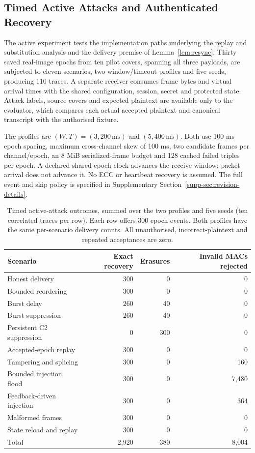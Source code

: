 \documentclass[pdflatex,sn-mathphys-num]{sn-jnl}%
\renewcommand{\arraystretch}{1.2}
\renewcommand{\arraystretch}{1.0}
\theoremstyle{definition}
\theoremstyle{game}
\theoremstyle{thmstyleone}%
\theoremstyle{thmstyletwo}%
\theoremstyle{thmstylethree}%
\begin{document}
\subsection{Timed Active Attacks and Authenticated Recovery}
\label{subsec:multichannel_robustness}
\label{subsec:revised-active}

The active experiment tests the implementation paths underlying the
replay and substitution analysis and the delivery premise of
Lemma~\ref{lem:resync}. Thirty saved real-image epochs from ten pilot
covers, spanning all three payloads, are subjected to eleven scenarios,
two window/timeout profiles and five seeds, producing 110 traces.
A separate receiver consumes frame bytes and virtual arrival times
with the shared configuration, session, secret and protected state.
Attack labels, source covers and expected plaintext are available only
to the evaluator, which compares each actual accepted plaintext and
canonical transcript with the authorised fixture.

The profiles are $(W,T)=(3,200\,\mathrm{ms})$ and
$(5,400\,\mathrm{ms})$. Both use 100 ms epoch spacing, maximum
cross-channel skew of 100 ms, two candidate frames per channel/epoch,
an 8 MiB serialized-frame budget and 128 cached failed triples per
epoch. A declared shared epoch clock advances the receive window;
packet arrival does not advance it. No ECC or heartbeat recovery is
assumed. The full event and skip policy is specified in Supplementary
Section~\ref{supp-sec:revision-details}.

\begin{table}[!t]
\centering\small
\caption{Timed active-attack outcomes, summed over the two profiles and
five seeds (ten correlated traces per row). Each row offers 300 epoch
events. Both profiles have the same per-scenario delivery counts. All
unauthorised, incorrect-plaintext and repeated acceptances are zero.}
\label{tab:active-window-results}
\setlength{\tabcolsep}{4pt}\renewcommand{\arraystretch}{1.1}
\begin{tabularx}{\textwidth}{@{}>{\raggedright\arraybackslash}Xrrr@{}}
\toprule
Scenario & Exact recovery & Erasures & Invalid MACs rejected\\
\midrule
Honest delivery & 300 & 0 & 0\\
Bounded reordering & 300 & 0 & 0\\
Burst delay & 260 & 40 & 0\\
Burst suppression & 260 & 40 & 0\\
Persistent C2 suppression & 0 & 300 & 0\\
Accepted-epoch replay & 300 & 0 & 0\\
Tampering and splicing & 300 & 0 & 160\\
Bounded injection flood & 300 & 0 & 7,480\\
Feedback-driven injection & 300 & 0 & 364\\
Malformed frames & 300 & 0 & 0\\
State reload and replay & 300 & 0 & 0\\
\midrule
Total & 2,920 & 380 & 8,004\\
\bottomrule
\end{tabularx}
\end{table}
\end{document}
